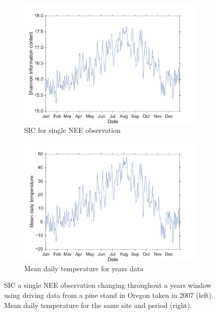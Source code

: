 \documentclass[11pt]{article}
\begin{document}
\begin{figure}[ht]
    \centering
    \begin{subfigure}[b]{0.45\textwidth}
        \includegraphics[width=\textwidth]{oregon2007SICneeD2.pdf}
        \caption{SIC for single NEE observation}
        \label{fig:sic_nee_oregon2007_D2}
    \end{subfigure}%
    \begin{subfigure}[b]{0.45\textwidth}
        \includegraphics[width=\textwidth]{oregon2007temp.pdf}
        \caption{Mean daily temperature for years data}
        \label{fig:temp_nee_oregon2007_D2}
    \end{subfigure}
    \caption{SIC a single NEE observation changing throughout a years window using driving data from a pine stand in Oregon taken in 2007 (left). Mean daily temperature for the same site and period (right).}
    \label{fig:neeSIC_temp_comp_D2}
\end{figure}
\end{document}
